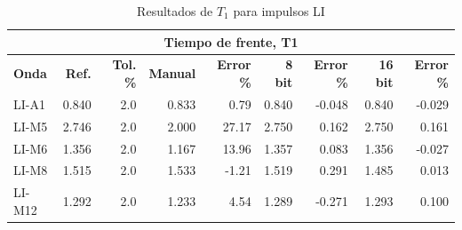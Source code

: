 \begin{table}[H]
    \centering
    \begin{tabular}{@{}lrrrrrrrr@{}}
        \toprule
        \multicolumn{9}{c}{\textbf{Tiempo de frente, T1}}                                                                                                                 \\ \midrule
        \textbf{Onda} & \textbf{Ref.} & \textbf{Tol. \%} & \textbf{Manual} & \textbf{Error \%} & \textbf{8 bit} & \textbf{Error \%} & \textbf{16 bit} & \textbf{Error \%} \\ \midrule
        LI-A1         & 0.840         & 2.0              & 0.833           & 0.79              & 0.840          & -0.048            & 0.840           & -0.029            \\ \midrule
        LI-M5         & 2.746         & 2.0              & 2.000           & 27.17             & 2.750          & 0.162             & 2.750           & 0.161             \\ \midrule
        LI-M6         & 1.356         & 2.0              & 1.167           & 13.96             & 1.357          & 0.083             & 1.356           & -0.027            \\ \midrule
        LI-M8         & 1.515         & 2.0              & 1.533           & -1.21             & 1.519          & 0.291             & 1.485           & 0.013             \\ \midrule
        LI-M12        & 1.292         & 2.0              & 1.233           & 4.54              & 1.289          & -0.271            & 1.293           & 0.100             \\ \bottomrule
    \end{tabular}
    \caption{Resultados de $T_1$ para impulsos LI}
    \label{tab:resultados_t1_li}
\end{table}

